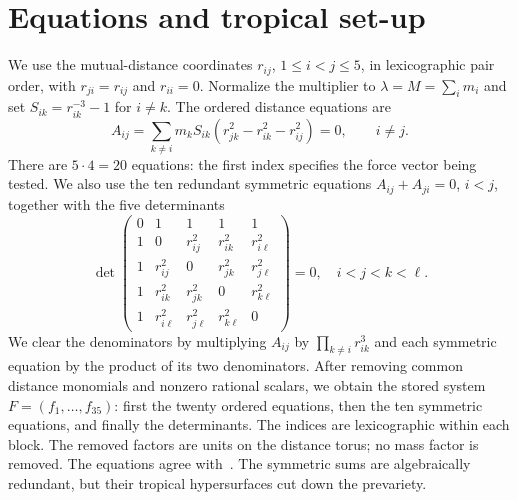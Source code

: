 \documentclass[11pt]{amsart}
\theoremstyle{definition}\newtheorem{definition}[theorem]{Definition}\theoremstyle{remark}\newtheorem{remark}[theorem]{Remark}
\begin{document}
\section{Equations and tropical set-up}\label{sec:setup}
We use the mutual-distance coordinates $r_{ij}$, $1\le i<j\le5$, in lexicographic pair order, with $r_{ji}=r_{ij}$ and $r_{ii}=0$. Normalize the multiplier to $\lambda=M=\sum_i m_i$ and set $S_{ik}=r_{ik}^{-3}-1$ for $i\ne k$. The ordered distance equations are
\begin{equation}\label{eq:AC}
 A_{ij}=\sum_{k\ne i}m_k S_{ik}
       (r_{jk}^2-r_{ik}^2-r_{ij}^2)=0,
       \qquad i\ne j.
\end{equation}
There are $5\cdot4=20$ equations: the first index specifies the force vector being tested. We also use the ten redundant symmetric equations $A_{ij}+A_{ji}=0$, $i<j$, together with the five determinants
\begin{equation}\label{eq:CM}
 \det\begin{pmatrix}
 0&1&1&1&1\\
 1&0&r_{ij}^2&r_{ik}^2&r_{i\ell}^2\\
 1&r_{ij}^2&0&r_{jk}^2&r_{j\ell}^2\\
 1&r_{ik}^2&r_{jk}^2&0&r_{k\ell}^2\\
 1&r_{i\ell}^2&r_{j\ell}^2&r_{k\ell}^2&0
 \end{pmatrix}=0,
 \quad i<j<k<\ell.
\end{equation}
We clear the denominators by multiplying $A_{ij}$ by $\prod_{k\ne i}r_{ik}^3$ and each symmetric equation by the product of its two denominators. After removing common distance monomials and nonzero rational scalars, we obtain the stored system $F=(f_1,\ldots,f_{35})$: first the twenty ordered equations, then the ten symmetric equations, and finally the determinants. The indices are lexicographic within each block. The removed factors are units on the distance torus; no mass factor is removed. The equations agree with~\citep[Section~2.2]{JL}. The symmetric sums are algebraically redundant, but their tropical hypersurfaces cut down the prevariety.
\end{document}
